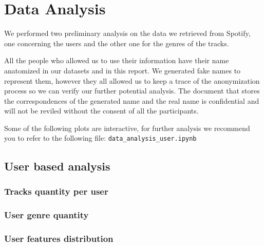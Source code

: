 \chapter{Data Analysis}
We performed two preliminary analysis on the data we retrieved from Spotify, one concerning the users and the other one for the genres of the tracks.

All the people who allowed us to use their information have their name anatomized in our datasets and in this report. We generated fake names to represent them, however they all allowed us to keep a trace of the anonymization process so we can verify our further potential analysis. The document that stores the correspondences of the generated name and the real name is confidential and will not be reviled without the consent of all the participants.

Some of the following plots are interactive, for further analysis we recommend you to refer to the following file: \texttt{data\_analysis\_user.ipynb}

\section{User based analysis}

\subsection{Tracks quantity per user}

\subsection{User genre quantity}

\subsection{User features distribution}

